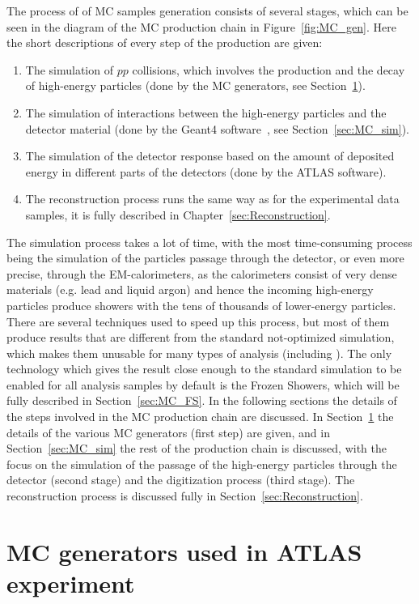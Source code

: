 The process of of MC samples generation consists of several stages, which can be seen in the diagram of the MC production chain in Figure~\ref{fig:MC_gen}. Here the short descriptions of every step of the production are given:
\begin{enumerate}
\item The simulation of $pp$ collisions, which involves the production and the decay of high-energy particles (done by the MC generators, see Section~\ref{sec:MC_gen}).
\item The simulation of interactions between the high-energy particles and the detector material (done by the Geant4 software~\cite{lib:geant4}, see Section~\ref{sec:MC_sim}).
\item The simulation of the detector response based on the amount of deposited energy in different parts of the detectors (done by the ATLAS software).
\item The reconstruction process runs the same way as for the experimental data samples, it is fully described in Chapter~\ref{sec:Reconstruction}.
\end{enumerate}
The simulation process takes a lot of time, with the most time-consuming process being the simulation of the particles passage through the detector, or even more precise, through the EM-calorimeters, as the calorimeters consist of very dense materials (e.g. lead and liquid argon) and hence the incoming high-energy particles produce showers with the tens of thousands of lower-energy particles. There are several techniques used to speed up this process, but most of them produce results that are different from the standard not-optimized simulation, which makes them unusable for many types of analysis (including \Zee). The only technology which gives the result close enough to the standard simulation to be enabled for all analysis samples by default is the Frozen Showers, which will be fully described in Section~\ref{sec:MC_FS}. In the following sections the details of the steps involved in the MC production chain are discussed. In Section~\ref{sec:MC_gen} the details of the various MC generators (first step) are given, and in Section~\ref{sec:MC_sim} the rest of the production chain is discussed, with the focus on the simulation of the passage of the high-energy particles through the detector (second stage) and the digitization process (third stage). The reconstruction process is discussed fully in Section~\ref{sec:Reconstruction}.

\section{MC generators used in ATLAS experiment}
\label{sec:MC_gen}


